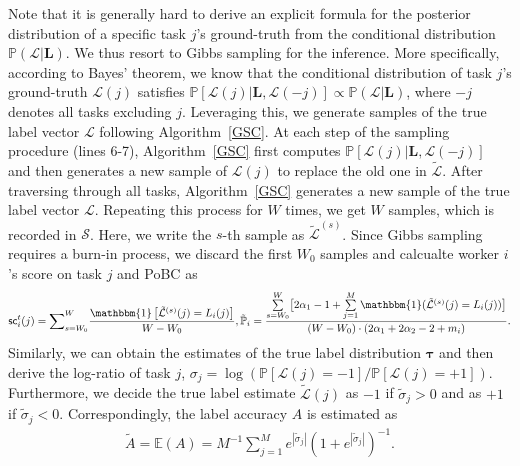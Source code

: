\documentclass{article}
\begin{document}
Note that it is generally hard to derive an explicit formula for the posterior distribution of a specific task $j$'s ground-truth from the conditional distribution $\mathbb{P}(\mathcal{L}|\bm{L})$. We thus resort to Gibbs sampling for the inference.
More specifically, according to Bayes' theorem, we know that the conditional distribution of task $j$'s ground-truth $\mathcal{L}(j)$ satisfies
$\mathbb{P}[\mathcal{L}(j)|\bm{L}, \mathcal{L}(-j)]\propto \mathbb{P}(\mathcal{L}|\bm{L})$, where $-j$ denotes all tasks excluding $j$.
Leveraging this, we generate samples of the true label vector $\mathcal{L}$ following Algorithm~\ref{GSC}.
At each step of the sampling procedure (lines 6-7), Algorithm~\ref{GSC} first computes $\mathbb{P}[\mathcal{L}(j)|\bm{L}, \mathcal{L}(-j)]$ and then generates a new sample of $\mathcal{L}(j)$ to replace the old one in $\tilde{\mathcal{L}}$.
After traversing through all tasks, Algorithm~\ref{GSC} generates a new sample of the true label vector $\mathcal{L}$.
Repeating this process for $W$ times, we get $W$ samples, which is recorded in $\mathcal{S}$.
Here, we write the $s$-th sample as $\tilde{\mathcal{L}}^{(s)}$.
Since Gibbs sampling requires a burn-in process, we discard the first $W_0$ samples and calcualte worker $i$'s score on task $j$ and PoBC as
\begin{equation}
\label{equaton:score}
\textsf{sc}^{t}_i(j) = {\sum}_{s=W_0}^{W}\frac{\mathbbm{1}\left[\tilde{\mathcal{L}}^{(s)}(j)=L_{i}(j)\right]}{W-W_0}, \tilde{\mathbb{P}}_{i}=\frac{\sum\limits_{s=W_0}^{W}\bigl[2\alpha_{1}-1+\sum\limits_{j=1}^{M}\mathbbm{1}(\tilde{\mathcal{L}}^{(s)}(j)=L_{i}(j))\bigr]}{(W-W_0)\cdot(2\alpha_{1}+2\alpha_{2}-2+m_i)}.
\end{equation}
Similarly, we can obtain the estimates of the true label distribution $\bm{\tau}$ and then derive the log-ratio of task $j$, $\sigma_j=\log(\mathbb{P}[\mathcal{L}(j)=-1]/\mathbb{P}[\mathcal{L}(j)=+1])$.
Furthermore, we decide the true label estimate $\tilde{\mathcal{L}}(j)$ as $-1$ if $\tilde{\sigma}_j>0$ and as $+1$ if $\tilde{\sigma}_j<0$.
Correspondingly, the label accuracy $A$ is estimated as
\begin{equation}
\label{vot}
\begin{split}
\tilde{A}=\mathbb{E}\left(A \right) = M^{-1}{\sum}_{j=1}^{M}e^{|\tilde{\sigma}_j|}\left(1+e^{|\tilde{\sigma}_j|}\right)^{-1}.
\end{split}
\end{equation}
\end{document}
